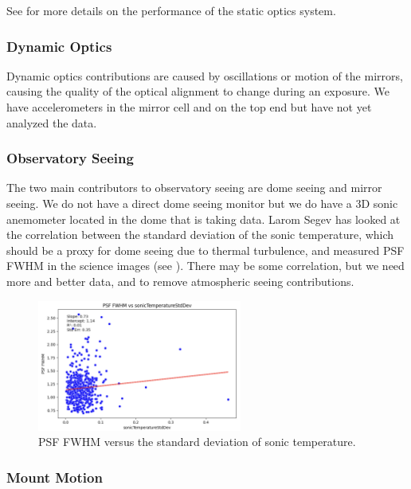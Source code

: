 See  for more details on the performance of the static optics system.

\subsubsection{Dynamic Optics}

Dynamic optics contributions are caused by oscillations or motion of the mirrors, causing the quality of the
optical alignment to change during an exposure. We have accelerometers in the mirror cell and on the top end
but have not yet analyzed the data.

\subsubsection{Observatory Seeing}

The two main contributors to observatory seeing are dome seeing and mirror seeing. We do not have a direct dome seeing monitor but we do have a 3D sonic anemometer located in the dome that is taking data. Larom Segev has looked at the correlation between the standard deviation of the sonic temperature, which should be a proxy for dome seeing due to thermal turbulence, and measured PSF FWHM in the science images (see ). There may be some correlation, but we need more and better data, and to remove atmospheric seeing contributions.

\begin{figure}
  \begin{center}
    \includegraphics[width=0.6\textwidth]{image_quality_figures/anemometer_PSF.png}
  \end{center}
  \caption{PSF FWHM versus the standard deviation of sonic temperature.}
  \label{fig:anemometer}
\end{figure}

\subsubsection{Mount Motion}

